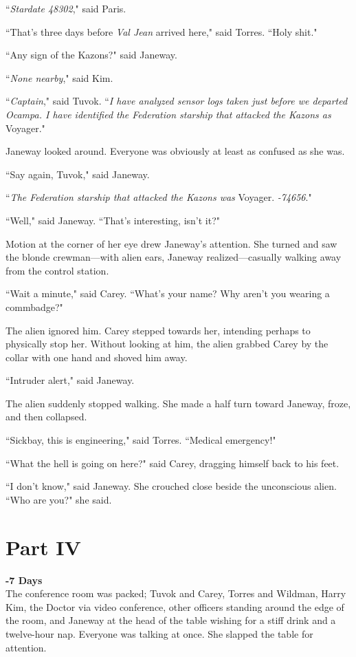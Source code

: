 \documentclass[twoside,letterpaper,12pt]{memoir}
\begin{document}
``\textit{Stardate 48302}," said Paris.

``That's three days before \textit{Val Jean} arrived here," said Torres. ``Holy shit."

``Any sign of the Kazons?" said Janeway.

``\textit{None nearby}," said Kim.

``\textit{Captain}," said Tuvok. ``\textit{I have analyzed sensor logs taken just before we departed Ocampa. I have identified the Federation starship that attacked the Kazons as}  Voyager."

Janeway looked around. Everyone was obviously at least as confused as she was.

``Say again, Tuvok," said Janeway.

``\textit{The Federation starship that attacked the Kazons was}  Voyager. \textit{-74656}."

``Well," said Janeway. ``That's interesting, isn't it?"

Motion at the corner of her eye drew Janeway's attention. She turned and saw the blonde crewman---with alien ears, Janeway realized---casually walking away from the control station.

``Wait a minute," said Carey. ``What's your name? Why aren't you wearing a commbadge?"

The alien ignored him. Carey stepped towards her, intending perhaps to physically stop her. Without looking at him, the alien grabbed Carey by the collar with one hand and shoved him away.

``Intruder alert," said Janeway.

The alien suddenly stopped walking. She made a half turn toward Janeway, froze, and then collapsed.

``Sickbay, this is engineering," said Torres. ``Medical emergency!"

``What the hell is going on here?" said Carey, dragging himself back to his feet.

``I don't know," said Janeway. She crouched close beside the unconscious alien. ``Who are you?" she said.

\chapter*{Part IV}

\noindent\textbf{-7 Days}\\

The conference room was packed; Tuvok and Carey, Torres and Wildman, Harry Kim, the Doctor via video conference, other officers standing around the edge of the room, and Janeway at the head of the table wishing for a stiff drink and a twelve-hour nap. Everyone was talking at once. She slapped the table for attention. 
\end{document}
